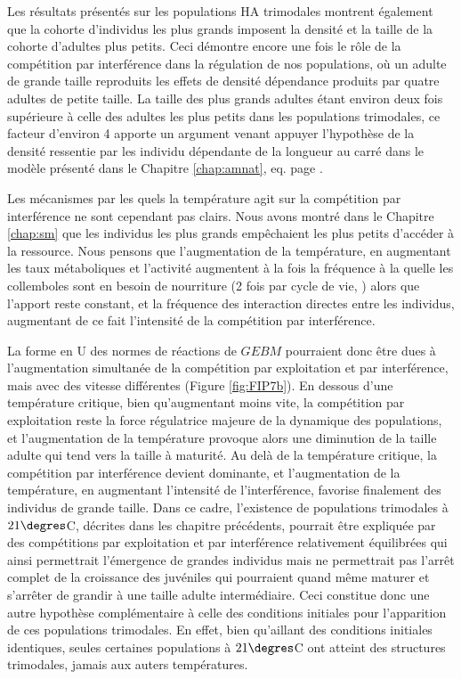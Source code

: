 Les résultats présentés sur les populations HA trimodales montrent également que
la cohorte d'individus les plus grands imposent la densité et la taille de la
cohorte d'adultes plus petits. Ceci démontre encore une fois le rôle de la
compétition par interférence dans la régulation de nos populations, où un
adulte de grande taille reproduits les effets de densité dépendance produits par
quatre adultes de petite taille. La taille des plus grands adultes étant environ
deux fois supérieure à celle des adultes les plus petits dans les populations
trimodales, ce facteur d'environ 4 apporte un argument venant appuyer
l'hypothèse de la densité ressentie par les individu dépendante de la longueur
au carré dans le modèle présenté dans le Chapitre \ref{chap:amnat}, eq.
 page \pageref{eq_an2}.

Les mécanismes par les quels la température agit sur la compétition par
interférence ne sont cependant pas clairs. Nous avons montré dans le Chapitre
\ref{chap:sm} que les individus les plus grands empêchaient les plus petits
d'accéder à la ressource. Nous pensons que l'augmentation de la température, en
augmentant les taux métaboliques et l'activité augmentent à la fois la fréquence
à la quelle les collemboles sont en besoin de nourriture (2 fois par cycle de
vie, \citealp{palevody1974a}) alors que l'apport reste constant, et la fréquence
des interaction directes entre les individus, augmentant de ce fait l'intensité
de la compétition par interférence. 

La forme en U des normes de réactions de $GEBM$ pourraient donc être dues à
l'augmentation simultanée de la compétition par exploitation et par
interférence, mais avec des vitesse différentes (Figure \ref{fig:FIP7b}). En
dessous d'une température critique, bien qu'augmentant moins vite, la
compétition par exploitation reste la force régulatrice majeure de la dynamique
des populations, et l'augmentation de la température provoque alors une
diminution de la taille adulte qui tend vers la taille à maturité. Au delà de la
température critique, la compétition par interférence devient dominante, et
l'augmentation de la température, en augmentant l'intensité de l'interférence,
favorise finalement des individus de grande taille. Dans ce cadre, l'existence
de populations trimodales à $21\degres$C, décrites dans les chapitre précédents,
pourrait être expliquée par des compétitions par exploitation et par
interférence relativement équilibrées qui ainsi permettrait l'émergence de
grandes individus mais ne permettrait pas l'arrêt complet de la croissance des
juvéniles qui pourraient quand même maturer et s'arrêter de grandir à une taille
adulte intermédiaire. Ceci constitue donc une autre hypothèse complémentaire à
celle des conditions initiales pour l'apparition de ces populations trimodales.
En effet, bien qu'aillant des conditions initiales identiques, seules certaines
populations à $21\degres$C ont atteint des structures trimodales, jamais aux
auters températures. 

